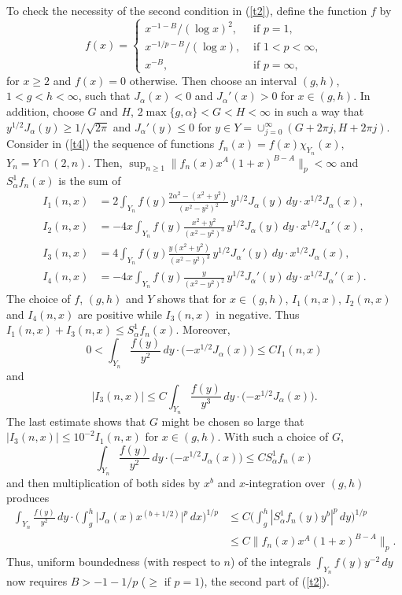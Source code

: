 \documentclass[leqno,a4paper]{amsart}
\begin{document}
To check the necessity of the second condition in (\ref{t2}), define the
function $f$ by
$$
f(x) =
\begin{cases}
x^{-1-B}/(\log x)^{2}, & \text{ if } p=1,\\
x^{-1/p-B}/(\log x), & \text{ if } 1<p<\infty,\\
x^{-B}, & \text{ if } p=\infty,
\end{cases}
$$
for $x\ge2$ and $f(x)=0$ otherwise. Then choose an interval $(g,h)$,
$1<g<h<\infty$, such that $J_\alpha(x)<0$ and $J_\alpha'(x)>0$ for $x\in(g,h)$.
In addition, choose $G$ and $H$, $2\max\{g,\alpha\}<G<H<\infty$ in such a way
that $y^{1/2}J_\alpha(y)\ge 1/\sqrt{2\pi}$ and $J_\alpha'(y)\le 0$ for
$y\in Y=\cup_{j=0}^\infty(G+2\pi j,H+2\pi j)$.
Consider in (\ref{t4}) the sequence of functions $f_n(x)=f(x)\chi_{Y_n}(x)$,
$Y_n=Y\cap(2,n)$. Then, $\sup_{n\ge1}\|f_n(x)x^A(1+x)^{B-A}\|_p<\infty$
and $S^1_\alpha f_n(x)$ is the sum of
\begin{align*}
I_1(n,x) &= 2\int_{Y_n}f(y)\frac{2\alpha^2-(x^2+y^2)}{(x^2-y^2)^2}
\,y^{1/2}J_\alpha(y)\,dy\cdot x^{1/2}J_\alpha(x),\\
I_2(n,x) &= -4x\int_{Y_n}f(y)\frac{x^2+y^2}{(x^2-y^2)^3}
\,y^{1/2}J_\alpha(y)\,dy\cdot x^{1/2}J_\alpha'(x),\\
I_3(n,x) &= 4\int_{Y_n}f(y)\frac{y(x^2+y^2)}{(x^2-y^2)^3}
\,y^{1/2}J_\alpha'(y)\,dy\cdot x^{1/2}J_\alpha(x),\\
I_4(n,x) &= -4x\int_{Y_n}f(y)\frac{y}{(x^2-y^2)^2}
\,y^{1/2}J_\alpha'(y)\,dy\cdot x^{1/2}J_\alpha'(x).
\end{align*}
The choice of $f$, $(g,h)$ and $Y$ shows that for $x\in(g,h)$, $I_1(n,x)$,
$I_2(n,x)$ and $I_4(n,x)$ are positive while $I_3(n,x)$ in negative. Thus
$I_1(n,x)+I_3(n,x)\le S^1_\alpha f_n(x)$. Moreover,
$$
0 < \int_{Y_n}\frac{f(y)}{y^2}\,dy \cdot
\big({-x^{1/2}}J_\alpha(x)\big)\le C I_1(n,x)
$$
and
$$
|I_3(n,x)|\le C\int_{Y_n}\frac{f(y)}{y^3}\,dy \cdot
\big({-x^{1/2}}J_\alpha(x)\big).
$$
The last estimate shows that $G$ might be chosen so large that
$|I_3(n,x)|\le 10^{-2}I_1(n,x)$ for $x\in(g,h)$. With such a choice of $G$,
$$
\int_{Y_n}\frac{f(y)}{y^2}\,dy \cdot
\big({-x^{1/2}}J_\alpha(x)\big)\le CS^1_\alpha
f_n(x)
$$
and then multiplication of both sides by $x^b$ and $x$-integration
over $(g,h)$ produces
\begin{align*}
\int_{Y_n}\frac{f(y)}{y^2}\,dy
\cdot \bigg(\int_g^h\big|J_\alpha(x)x^{(b+1/2)} \big|^p\,dx\bigg)^{1/p}
&\le C\bigg(\int_g^h|S^1_\alpha f_n(y)y^b|^p\,dy\bigg)^{1/p}\\
&\le C\|f_n(x)x^A(1+x)^{B-A}\|_p.
\end{align*}
Thus, uniform boundedness (with respect to $n$) of the integrals
$\int_{Y_n}f(y)y^{-2}\,dy$ now requires $B>-1-1/p$ ($\ge$ if $p=1$),
the second part of (\ref{t2}).
\end{document}
